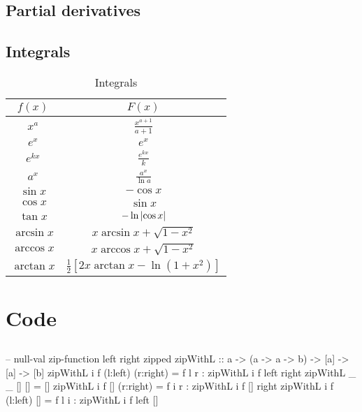 \subsection{Partial derivatives}

\subsection{Integrals} 
\begin{table}[h!]
    \centering
    \caption{Integrals}
    \begin{tabular}{|c|c|}
    \hline 
         $f(x)$ & $F(x)$ \\
    \hline 
         $x^a$       & $\frac{x^{a+1}}{a+1}$ \\
         $e^x$       & $e^x$ \\
         $e^{kx}$    & $\frac{e^{kx}}{k}$ \\
         $a^{x}$     & $\frac{a^x}{\ln a}$ \\
         $\sin x$    & $-\cos x$ \\
         $\cos x$    & $\sin x$ \\
         $\tan x$    & $-\ln \abs{\cos x}$ \\
         $\arcsin x$ & $x \arcsin x + \sqrt{1-x^2}$ \\
         $\arccos x$ & $x \arccos x + \sqrt{1-x^2}$ \\
         $\arctan x$ & $\frac{1}{2} \left[2x \arctan x - \ln (1 + x^2)\right]$
         \\ \hline
    \end{tabular}
    \label{tab:integrals}
\end{table}

\section{Code}\label{sec:appcode}
\subsection{}\label{sec:appcodezipwithl}
\begin{code}[caption={Extension of \texttt{zipWith}. If lists are equal in length \texttt{zipWithL} and \texttt{zipWith} are identical. When one list has exhausted their elements, \texttt{i} is used instead}. \texttt{zipWithL k f [a0,a1,a2] [b0,b1,b2,b3,b4]} becomes \texttt{[a0 `f` b0, a1 `f` b1, a2 `f` b2, i `f` b3, i `f` b4].}]
--       null-val zip-function   left   right  zipped
zipWithL :: a -> (a -> a -> b) -> [a] -> [a] -> [b]
zipWithL i f (l:left) (r:right) = f l r : zipWithL i f left right
zipWithL _ _ []       []        = []
zipWithL i f []       (r:right) = f i r : zipWithL i f []   right
zipWithL i f (l:left) []        = f l i : zipWithL i f left []
\end{code}
